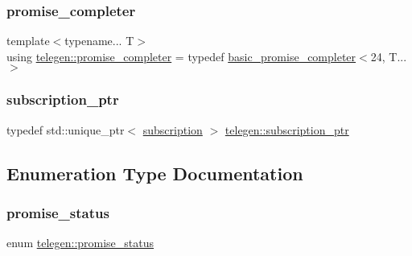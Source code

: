 \mbox{\label{namespacetelegen_add9ca0e0a0f74c60e76b94f56c17edc7}} 
\subsubsection{\texorpdfstring{promise\+\_\+completer}{promise\_completer}}
{\footnotesize\ttfamily template$<$typename... T$>$ \\
using \hyperlink{namespacetelegen_add9ca0e0a0f74c60e76b94f56c17edc7}{telegen\+::promise\+\_\+completer} = typedef \hyperlink{classtelegen_1_1basic__promise__completer}{basic\+\_\+promise\+\_\+completer}$<$24, T...$>$}

\mbox{\label{namespacetelegen_a27c822534a5231fe1c523c81e8768afb}} 
\subsubsection{\texorpdfstring{subscription\+\_\+ptr}{subscription\_ptr}}
{\footnotesize\ttfamily typedef std\+::unique\+\_\+ptr$<$ \hyperlink{classtelegen_1_1subscription}{subscription} $>$ \hyperlink{namespacetelegen_a27c822534a5231fe1c523c81e8768afb}{telegen\+::subscription\+\_\+ptr}}



\subsection{Enumeration Type Documentation}
\mbox{\label{namespacetelegen_a51e8b7480c7247182e2c6ca35e2c7504}} 
\subsubsection{\texorpdfstring{promise\+\_\+status}{promise\_status}}
{\footnotesize\ttfamily enum \hyperlink{namespacetelegen_a51e8b7480c7247182e2c6ca35e2c7504}{telegen\+::promise\+\_\+status}\hspace{0.3cm}{\ttfamily [strong]}}

